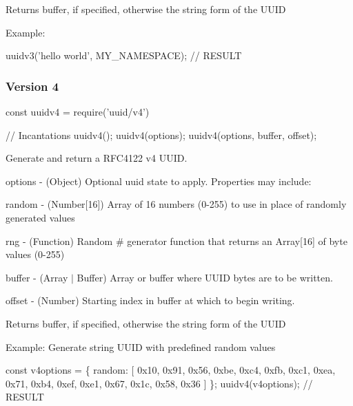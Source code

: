 Returns {\ttfamily buffer}, if specified, otherwise the string form of the U\+U\+ID

Example\+:


\begin{DoxyCode}
uuidv3('hello world', MY\_NAMESPACE);  // RESULT
\end{DoxyCode}


\subsubsection*{Version 4}


\begin{DoxyCode}
const uuidv4 = require('uuid/v4')

// Incantations
uuidv4();
uuidv4(options);
uuidv4(options, buffer, offset);
\end{DoxyCode}


Generate and return a R\+F\+C4122 v4 U\+U\+ID.


\begin{DoxyItemize}
\item {\ttfamily options} -\/ (Object) Optional uuid state to apply. Properties may include\+:
\begin{DoxyItemize}
\item {\ttfamily random} -\/ (Number\mbox{[}16\mbox{]}) Array of 16 numbers (0-\/255) to use in place of randomly generated values
\item {\ttfamily rng} -\/ (Function) Random \# generator function that returns an Array\mbox{[}16\mbox{]} of byte values (0-\/255)
\end{DoxyItemize}
\item {\ttfamily buffer} -\/ (Array $\vert$ Buffer) Array or buffer where U\+U\+ID bytes are to be written.
\item {\ttfamily offset} -\/ (Number) Starting index in {\ttfamily buffer} at which to begin writing.
\end{DoxyItemize}

Returns {\ttfamily buffer}, if specified, otherwise the string form of the U\+U\+ID

Example\+: Generate string U\+U\+ID with predefined {\ttfamily random} values


\begin{DoxyCode}
const v4options = \{
  random: [
    0x10, 0x91, 0x56, 0xbe, 0xc4, 0xfb, 0xc1, 0xea,
    0x71, 0xb4, 0xef, 0xe1, 0x67, 0x1c, 0x58, 0x36
  ]
\};
uuidv4(v4options); // RESULT
\end{DoxyCode}


